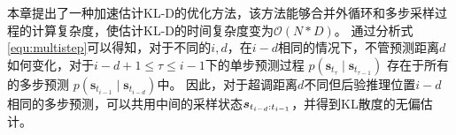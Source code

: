 本章提出了一种加速估计KL-D的优化方法，该方法能够合并外循环和多步采样过程的计算复杂度，使估计KL-D的时间复杂度变为$\mathcal{O}(N*D)$。
通过分析式\eqref{equ:multistep}可以得知，对于不同的$i,d$，在$i-d$相同的情况下，不管预测距离$d$如何变化，对于$i-d + 1 \leq \tau \leq i-1$下的单步预测过程 $p\left(\boldsymbol{s}_{t_\tau} \mid \boldsymbol{s}_{t_{\tau-1}}\right)$ 存在于所有的多步预测 $p\left(\boldsymbol{s}_{t_{i-1}} \mid \boldsymbol{s}_{t_{i-d}}\right)$中。
因此，对于超调距离$d$不同但后验推理位置$i-d$相同的多步预测，可以共用中间的采样状态$\boldsymbol{s}_{t_{i-d}:t_{i-1}}$，并得到KL散度的无偏估计。


